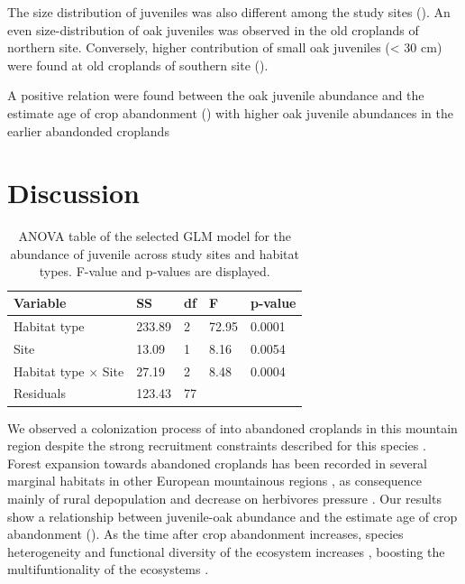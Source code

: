 The size distribution of juveniles was also different among the study sites (). An even size-distribution of oak juveniles was observed in the old croplands of northern site. Conversely, higher contribution of small oak juveniles (< 30 cm) were found at old croplands of southern site (). 

A positive relation were found between the oak juvenile abundance and the estimate age of crop abandonment () with higher oak juvenile abundances in the earlier abandonded croplands 

\section{Discussion}\label{sec:coloniza:disussion}

\begin{table}
\caption{ANOVA table of the selected GLM model for the abundance of \Qpy juvenile across study sites and habitat types. F-value and p-values are displayed.}
\centering
\begin{tabular}{lllll} 
\toprule
\textbf{Variable}        & \textbf{SS} & \textbf{df} & \textbf{F} & \textbf{p-value}  \\ 
\midrule
Habitat type             & 233.89      & 2           & 72.95      &  0.0001           \\
Site                     & 13.09       & 1           & 8.16       & 0.0054            \\
Habitat type $\times$ Site & 27.19       & 2           & 8.48       & 0.0004            \\
Residuals                & 123.43      & 77          &            &                   \\
\bottomrule
\end{tabular}
\label{tab:coloniza:anova}
\end{table}

We observed a colonization process of \Qpy into abandoned croplands in this mountain region despite the strong recruitment constraints described for this species \autocites{Bravoetal2008SelviculturaMontes,Gomez2003ImpactVertebrate,Pereaetal2014InteraccionesPlantaanimal}. Forest expansion towards abandoned croplands has been recorded in several marginal habitats in other European mountainous regions \autocites{Amezteguietal2016LanduseLegacies,Nataleetal2007StudyTree,Piussi2000ExpansionEuropean,Amezteguietal2010LanduseChanges,LasantaMartinezetal2005MountainMediterranean,Kozak2003ForestCover,AlvarezMartinezetal2014InfluenceLand,VicenteSerranoetal2004AnalysisSpatial}, as consequence mainly of rural depopulation and decrease on herbivores pressure \autocite{MacDonaldetal2000AgriculturalAbandonment,EuropeanEnvironmentAgency2016EuropeanForest}. Our results show a relationship between juvenile-oak abundance and the estimate age of crop abandonment (). As the time after crop abandonment increases, species heterogeneity and functional diversity of the ecosystem increases \autocites{PuertaPineroetal2012HistoryMatters,HermyVerheyen2007LegaciesPresentday}, boosting the multifuntionality of the ecosystems \autocite{CruzAlonsoetal2019LongTerm}. 

